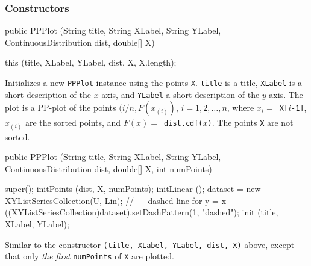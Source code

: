 \subsubsection*{Constructors}

\begin{code}

   public PPPlot (String title, String XLabel, String YLabel,
                  ContinuousDistribution dist, double[] X) \begin{hide} {
      this (title, XLabel, YLabel, dist, X, X.length);
   }\end{hide}
\end{code}
\begin{tabb}
   Initializes a new \texttt{PPPlot} instance using the points \texttt{X}.
   \texttt{title} is a title, \texttt{XLabel} is a short description of
   the $x$-axis, and \texttt{YLabel}  a short description of the $y$-axis.
   The plot is a PP-plot of the points
   $(i/n, F(x_{(i)})$, $i= 1, 2, \ldots, n$, where $x_i = $\texttt{ X[$i$-1]},
   $x_{(i)}$ are the  sorted points,  and $F(x) = $\texttt{ dist.cdf($x$)}.
   The points \texttt{X} are not  sorted.
\end{tabb}
\begin{htmlonly}
\end{htmlonly}
\begin{code}

   public PPPlot (String title, String XLabel, String YLabel,
                  ContinuousDistribution dist, double[] X, int numPoints) \begin{hide} {
      super();
      initPoints (dist, X, numPoints);
      initLinear ();
      dataset = new XYListSeriesCollection(U, Lin);
      // --- dashed line for y = x
      ((XYListSeriesCollection)dataset).setDashPattern(1, "dashed");
      init (title, XLabel, YLabel);
   }\end{hide}
\end{code}
\begin{tabb}
   Similar to the constructor
  \texttt{(title, XLabel, YLabel, dist, X)}
   above, except that only \emph{the first} \texttt{numPoints} of \texttt{X}
    are plotted.
\end{tabb}
\begin{htmlonly}
\end{htmlonly}
